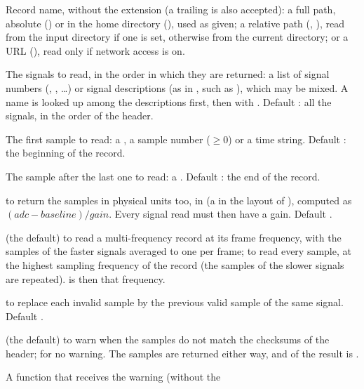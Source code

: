 \begin{params}
\item[record] Record name, without the  extension (a trailing  is
  also accepted): a full path, absolute () or in the home
  directory (), used as given; a relative path
  (, ), read from the input directory if one is set,
  otherwise from the current directory; or a URL
  (), read only if network access is
  on.
\item[channels] The signals to read, in the order in which they are returned: a list of
  signal numbers (, , \ldots) or signal descriptions (as in
  , such as ), which may be mixed. A name is looked up
  among the descriptions first, then with . Default : all the
  signals, in the order of the header.
\item[from] The first sample to read: a , a sample number ($\ge 0$) or a
  time string. Default : the beginning of the record.
\item[to] The sample after the last one to read: a . Default :
  the end of the record.
\item[physical]  to return the samples in physical units too, in
   (a  in the layout of ), computed
  as $(\mathit{adc} - \mathit{baseline}) / \mathit{gain}$. Every signal read must then have
  a gain. Default .
\item[highres]  (the default) to read a multi-frequency record at its frame
  frequency, with the samples of the faster signals averaged to one per frame;
   to read every sample, at the highest sampling frequency of the record (the
  samples of the slower signals are repeated).  is then that frequency.
\item[pad]  to replace each invalid sample by the previous valid sample of the
  same signal. Default .
\item[checksumWarning]  (the default) to warn when the samples do not match
  the checksums of the header;  for no warning. The samples are returned
  either way, and  of the result is .
\item[onWarning] A function that receives the warning (without the 

\end{params}
